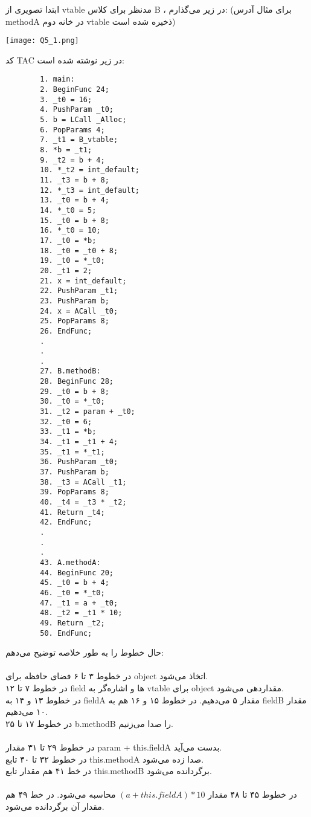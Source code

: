 ابتدا تصویری از vtable مدنظر برای کلاس B ، در زیر می‌گذارم: (برای مثال آدرس methodA در خانه دوم vtable ذخیره شده است)\\
\graphicspath{{./images/}}
\begin{center}
	\texttt{[image: Q5\_1.png]}
\end{center}
کد TAC در زیر نوشته شده است:
\begin{latin}
	\begin{verbatim}
		1. main:
		2. BeginFunc 24;
		3. _t0 = 16;
		4. PushParam _t0;
		5. b = LCall _Alloc;
		6. PopParams 4;
		7. _t1 = B_vtable;
		8. *b = _t1;
		9. _t2 = b + 4;
		10. *_t2 = int_default;
		11. _t3 = b + 8;
		12. *_t3 = int_default;
		13. _t0 = b + 4;
		14. *_t0 = 5;
		15. _t0 = b + 8;
		16. *_t0 = 10;
		17. _t0 = *b;
		18. _t0 = _t0 + 8;
		19. _t0 = *_t0;
		20. _t1 = 2;
		21. x = int_default;
		22. PushParam _t1;
		23. PushParam b;
		24. x = ACall _t0;
		25. PopParams 8;
		26. EndFunc;
		.
		.
		.
		27. B.methodB:
		28. BeginFunc 28;
		29. _t0 = b + 8;
		30. _t0 = *_t0;
		31. _t2 = param + _t0; 
		32. _t0 = 6;
		33. _t1 = *b;
		34. _t1 = _t1 + 4;
		35. _t1 = *_t1;
		36. PushParam _t0;
		37. PushParam b;
		38. _t3 = ACall _t1;
		39. PopParams 8;
		40. _t4 = _t3 * _t2;
		41. Return _t4;
		42. EndFunc;
		.
		.
		.
		43. A.methodA:
		44. BeginFunc 20;
		45. _t0 = b + 4;
		46. _t0 = *_t0;
		47. _t1 = a + _t0;
		48. _t2 = _t1 * 10;
		49. Return _t2;
		50. EndFunc;
	\end{verbatim}
\end{latin}
حال خطوط را به طور خلاصه توضیح می‌دهم:\\\\
در خطوط ۳ تا ۶ فضای حافظه برای object اتخاذ می‌شود.\\
در خطوط ۷ تا ۱۲ field ها و اشاره‌گر به vtable برای object مقداردهی می‌شود.\\
در خطوط ۱۳ و ۱۴ به fieldA مقدار ۵ می‌دهیم. در خطوط ۱۵ و ۱۶ هم به fieldB مقدار ۱۰ می‌دهیم.\\
در خطوط ۱۷ تا ۲۵ b.methodB را صدا می‌زنیم.\\\\
در خطوط ۲۹ تا ۳۱ مقدار param + this.fieldA بدست می‌آید.\\
در خطوط ۳۲ تا ۴۰ تابع this.methodA صدا زده می‌شود.\\
در خط ۴۱ هم مقدار تابع this.methodB برگردانده می‌شود.\\\\
در خطوط ۴۵ تا ۴۸ مقدار $(a + this.fieldA) * 10$ محاسبه می‌شود.
در خط ۴۹ هم مقدار آن برگردانده می‌شود.




